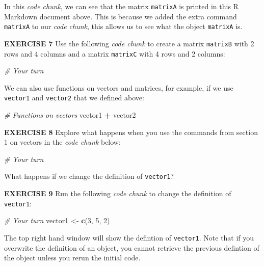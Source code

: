\documentclass[
]{article}
\newenvironment{Shaded}{\begin{snugshade}}{\end{snugshade}}
\newcommand{\CommentTok}[1]{\textcolor[rgb]{0.56,0.35,0.01}{\textit{#1}}}
\newcommand{\DecValTok}[1]{\textcolor[rgb]{0.00,0.00,0.81}{#1}}
\newcommand{\KeywordTok}[1]{\textcolor[rgb]{0.13,0.29,0.53}{\textbf{#1}}}
\newcommand{\NormalTok}[1]{#1}
\newcommand{\OperatorTok}[1]{\textcolor[rgb]{0.81,0.36,0.00}{\textbf{#1}}}
\newcommand{\StringTok}[1]{\textcolor[rgb]{0.31,0.60,0.02}{#1}}
\begin{document}
In this \emph{code chunk}, we can see that the matrix \texttt{matrixA}
is printed in this R Markdown document above. This is because we added
the extra command \texttt{matrixA} to our \emph{code chunk}, this allows
us to see what the object \texttt{matrixA} is.

\textbf{EXERCISE 7} Use the following \emph{code chunk} to create a
matrix \texttt{matrixB} with 2 rows and 4 columns and a matrix
\texttt{matrixC} with 4 rows and 2 columns:

\begin{Shaded}
\begin{Highlighting}[]
\CommentTok{# Your turn}
\end{Highlighting}
\end{Shaded}

We can also use functions on vectors and matrices, for example, if we
use \texttt{vector1} and \texttt{vector2} that we defined above:

\begin{Shaded}
\begin{Highlighting}[]
\CommentTok{# Functions on vectors}
\NormalTok{vector1 }\OperatorTok{+}\StringTok{ }\NormalTok{vector2}
\end{Highlighting}
\end{Shaded}

\textbf{EXERCISE 8} Explore what happens when you use the commands from
section 1 on vectors in the \emph{code chunk} below:

\begin{Shaded}
\begin{Highlighting}[]
\CommentTok{# Your turn}
\end{Highlighting}
\end{Shaded}

What happens if we change the definition of \texttt{vector1}?

\textbf{EXERCISE 9} Run the following \emph{code chunk} to change the
definition of \texttt{vector1}:

\begin{Shaded}
\begin{Highlighting}[]
\CommentTok{# Your turn}
\NormalTok{vector1 <-}\StringTok{ }\KeywordTok{c}\NormalTok{(}\DecValTok{3}\NormalTok{, }\DecValTok{5}\NormalTok{, }\DecValTok{2}\NormalTok{)}
\end{Highlighting}
\end{Shaded}

The top right hand window will show the defintion of \texttt{vector1}.
Note that if you overwrite the definition of an object, you cannot
retrieve the previous defintion of the object unless you rerun the
initial code.
\end{document}
